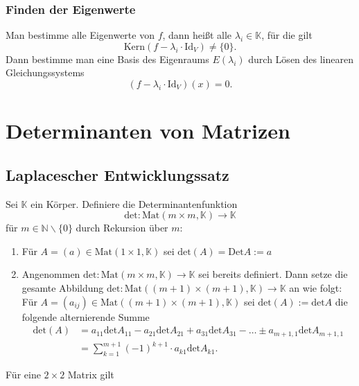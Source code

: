 \documentclass[a4paper,12pt]{article}
\numberwithin{equation}{section}
\begin{document}
\subsubsection{Finden der Eigenwerte}
Man bestimme alle Eigenwerte von $f$, dann heißt alle $\lambda _i \in \mathbb{K}$, für die gilt
\[ 
        \text{Kern}\left(f-\lambda _i\cdot \text{Id}_V\right)\neq \{0\}
.\] 
Dann bestimme man eine Basis des Eigenraums $E\left(\lambda _i\right)$ durch Lösen des linearen Gleichungssystems
\[ 
        \left(f-\lambda _i\cdot \text{Id}_V\right)\left(x\right)=0
.\] 

\section{Determinanten von Matrizen}

\subsection{Laplacescher Entwicklungssatz}
Sei $\mathbb{K}$ ein Körper. Definiere die Determinantenfunktion
\[ 
        \text{det}:\text{Mat}\left(m\times m,\mathbb{K}\right)\rightarrow \mathbb{K}
\] 
für $m \in \mathbb{N}\backslash\{0\}$ durch Rekursion über $m$:
\begin{enumerate}[label=(\alph*)]
        \item Für $A=\left(a\right) \in \text{Mat}\left(1\times 1,\mathbb{K}\right)$ sei $\text{det}\left(A\right)=\text{Det}A:=a$ 
        \item Angenommen $\text{det}:\text{Mat}\left(m\times m,\mathbb{K}\right)\rightarrow \mathbb{K}$ sei bereits definiert. Dann setze die gesamte Abbildung $\text{det}:\text{Mat}\left(\left(m+1\right)\times\left(m+1\right),\mathbb{K}\right)\rightarrow \mathbb{K}$ an wie folgt:\\Für $A=\left(a_{ij}\right) \in \text{Mat}\left(\left(m+1\right)\times\left(m+1\right),\mathbb{K}\right)$ sei $\text{det}\left(A\right):=\text{det}A$ die folgende alternierende Summe
                \begin{align*} 
                        \text{det}\left(A\right)&=a_{11}\text{det}A_{11}-a_{21}\text{det}A_{21}+a_{31}\text{det}A_{31}-\hdots \pm a_{m+1,1}\text{det}A_{m+1,1}\\
                                                &=\sum_{k=1}^{m+1}\left(-1\right)^{k+1}\cdot a_{k1}\text{det}A_{k1}
                .\end{align*}
\end{enumerate}
Für eine $2\times 2$ Matrix gilt
\end{document}

